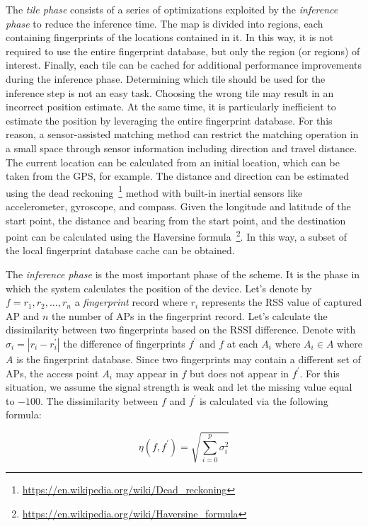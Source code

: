 The \textit{tile phase} consists of a series of optimizations exploited by the \textit{inference phase} to reduce the inference time. The map is
divided into regions, each containing fingerprints of the locations contained in it. In this way, it is not required to use the entire fingerprint
database, but only the region (or regions) of interest. Finally, each tile can be cached for additional performance improvements during the inference
phase. Determining which tile should be used for the inference step is not an easy task. Choosing the wrong tile may result in an incorrect position
estimate. At the same time, it is particularly inefficient to estimate the position by leveraging the entire fingerprint database. For this reason, a
sensor-assisted matching method can restrict the matching operation in a small space through sensor information including direction and travel
distance. The current location can be calculated from an initial location, which can be taken from the GPS, for example. The distance and direction
can be estimated using the dead reckoning~\footnote{\url{https://en.wikipedia.org/wiki/Dead_reckoning}} method with built-in inertial sensors like
accelerometer, gyroscope, and compass. Given the longitude and latitude of the start point, the distance and bearing from the start point, and the
destination point can be calculated using the Haversine formula~\footnote{\url{https://en.wikipedia.org/wiki/Haversine_formula}}. In this way, a
subset of the local fingerprint database cache can be obtained.

The \textit{inference phase} is the most important phase of the scheme. It is the phase in which the system calculates the position of the device.
Let's denote by $f = {r_1, r_2, \ldots, r_n}$ a \textit{fingerprint} record where $r_i$ represents the RSS value of captured AP and $n$ the number of
APs in the fingerprint record. Let's calculate the dissimilarity between two fingerprints based on the RSSI difference. Denote with $\sigma_i = | r_i
	- r^{'}_{i}|$ the difference of fingerprints $f^{'}$ and $f$ at each $A_i$ where $A_i \in A$ where $A$ is the fingerprint database. Since two
fingerprints may contain a different set of APs, the access point $A_i$ may appear in $f$ but does not appear in $f^{'}$. For this situation, we
assume the signal strength is weak and let the missing value equal to $-100$. The dissimilarity between $f$ and $f^{'}$ is calculated via the
following formula:

\begin{equation}
	\eta(f, f^{'}) = \sqrt{\sum_{i=0}^{p} \sigma_i^{2}}
	\label{eq:dissimilarity}
\end{equation}

